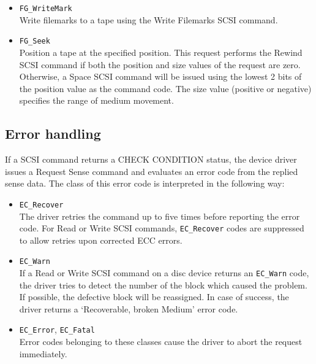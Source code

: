 \begin{itemize}
  \item {\tt FG\_WriteMark} \\
        Write filemarks to a tape using the Write Filemarks SCSI command.

  \item {\tt FG\_Seek} \\
        Position a tape at the specified position. This request performs the
        Rewind SCSI command if both the position and size values of the
        request are zero. Otherwise, a Space SCSI command will be issued using
        the lowest 2 bits of the position value as the command code. The size
        value (positive or negative) specifies the range of medium movement.

\end{itemize}

\subsection{Error handling}
If a SCSI command returns a CHECK CONDITION status, the device driver issues
a Request Sense command and evaluates an error code from the replied sense
data. The class of this error code is interpreted in the following way:

\begin{itemize}

  \item {\tt EC\_Recover} \\
        The driver retries the command up to five times before reporting the
        error code. For Read or Write SCSI commands, {\tt EC\_Recover} codes
        are suppressed to allow retries upon corrected ECC errors.

  \item {\tt EC\_Warn} \\
        If a Read or Write SCSI command on a disc device returns an
        {\tt EC\_Warn} code, the driver tries to detect the number of the
        block which caused the problem. If possible, the defective block will
        be reassigned. In case of success, the driver returns a `Recoverable,
        broken Medium' error code.

  \item {\tt EC\_Error},
        {\tt EC\_Fatal} \\
        Error codes belonging to these classes cause the driver to abort the
        request immediately.

\end{itemize}

